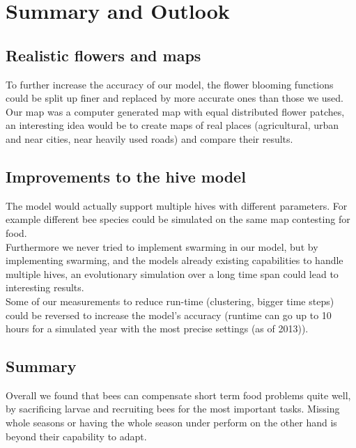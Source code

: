 \section{Summary and Outlook}
\subsection{Realistic flowers and maps}
	To further increase the accuracy of our model, the flower blooming functions could be split up finer and replaced by more accurate ones than those we used. Our map was a computer generated map with equal distributed flower patches, an interesting idea would be to create maps of real places (agricultural, urban and near cities, near heavily used roads) and compare their results.
\subsection{Improvements to the hive model}
	The model would actually support multiple hives with different parameters. For example different bee species could be simulated on the same map contesting for food. \\Furthermore we never tried to implement swarming in our model, but by implementing swarming, and the models already existing capabilities to handle multiple hives, an evolutionary simulation over a long time span could lead to interesting results.\\Some of our measurements to reduce run-time (clustering, bigger time steps) could be reversed to increase the model's accuracy (runtime can go up to 10 hours for a simulated year with the most precise settings (as of 2013)).
\subsection{Summary}
	Overall we found that bees can compensate short term food problems quite well, by sacrificing larvae and recruiting bees for the most important tasks. Missing whole seasons or having the whole season under perform on the other hand is beyond their capability to adapt. 